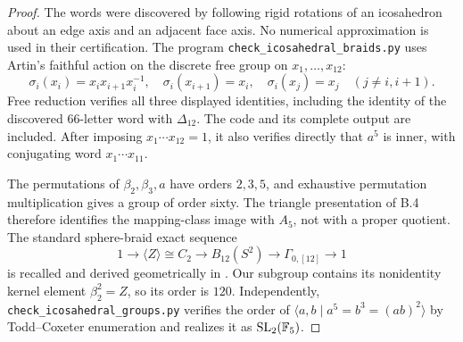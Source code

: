 \begin{proof}
The words were discovered by following rigid rotations of an icosahedron
about an edge axis and an adjacent face axis. No numerical approximation
is used in their certification. The program
\texttt{check\_icosahedral\_braids.py} uses Artin's faithful action on
the discrete free group on \(x_1,\ldots,x_{12}\):
\[
 \sigma_i(x_i)=x_ix_{i+1}x_i^{-1},\quad
 \sigma_i(x_{i+1})=x_i,\quad
 \sigma_i(x_j)=x_j\quad(j\ne i,i+1).
\]
Free reduction verifies all three displayed identities, including the
identity of the discovered 66-letter word with \(\Delta_{12}\).
The code and its complete output are included. After imposing
\(x_1\cdots x_{12}=1\), it also verifies directly that \(a^5\)
is inner, with conjugating word \(x_1\cdots x_{11}\).

The permutations of \(\beta_2,\beta_3,a\) have orders \(2,3,5\),
and exhaustive permutation multiplication gives a group of order
sixty. The triangle presentation of B.4 therefore identifies the
mapping-class image with \(A_5\), not with a proper quotient.
The standard sphere-braid exact sequence
\[
 1\longrightarrow\langle Z\rangle\cong C_2
 \longrightarrow B_{12}(S^2)
 \longrightarrow\Gamma_{0,[12]}\longrightarrow1
\]
is recalled and derived geometrically in
\citet[Sections 1--3]{GoncalvesGuaschi2008}.
Our subgroup contains its nonidentity kernel element \(\beta_2^2=Z\),
so its order is \(120\). Independently,
\texttt{check\_icosahedral\_groups.py} verifies the order of
\(\langle a,b\mid a^5=b^3=(ab)^2\rangle\) by Todd--Coxeter
enumeration and realizes it as \(\operatorname{SL}_2(\mathbb F_5)\).


\end{proof}

